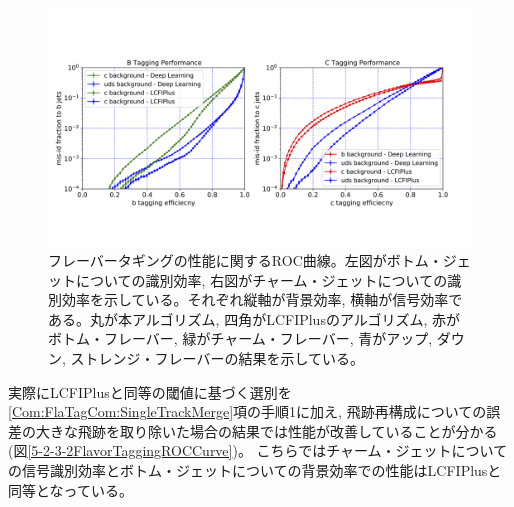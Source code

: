 \begin{figure}[htbp]
 \centering
 \includegraphics[trim = 0 150 0 200, width=1.0\textwidth, clip]{Figure/5Comparison/5-2-3-1FlavorTaggingROCCurve.png}
 \caption[フレーバータギングの性能に関するROC曲線]{フレーバータギングの性能に関するROC曲線。左図がボトム・ジェットについての識別効率, 右図がチャーム・ジェットについての識別効率を示している。それぞれ縦軸が背景効率, 横軸が信号効率である。丸が本アルゴリズム, 四角がLCFIPlusのアルゴリズム, 赤がボトム・フレーバー, 緑がチャーム・フレーバー, 青がアップ, ダウン, ストレンジ・フレーバーの結果を示している。}
 \label{5-2-3-1FlavorTaggingROCCurve}
\end{figure}

実際にLCFIPlusと同等の閾値に基づく選別を\ref{Com:FlaTagCom:SingleTrackMerge}項の手順1に加え, 飛跡再構成についての誤差の大きな飛跡を取り除いた場合の結果では性能が改善していることが分かる (図\ref{5-2-3-2FlavorTaggingROCCurve})。
こちらではチャーム・ジェットについての信号識別効率とボトム・ジェットについての背景効率での性能はLCFIPlusと同等となっている。

